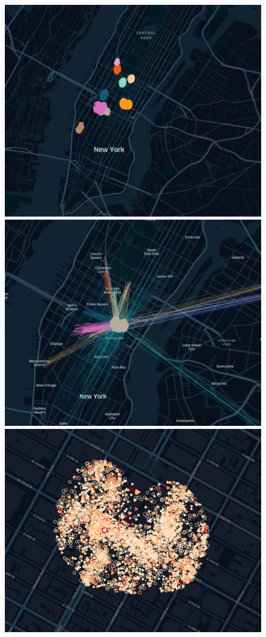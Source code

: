 \documentclass[sigconf, authorversion, nonacm=true]{acmart}
\begin{document}
\begin{figure}[!htb]
  \includegraphics[width=\linewidth]{semanticzoom1}
\endminipage\hfill
{}
  \includegraphics[width=\linewidth]{semanticzoom2}
\endminipage\hfill
{}%
  \includegraphics[width=\linewidth]{semanticzoom3}

\end{figure}
\end{document}
